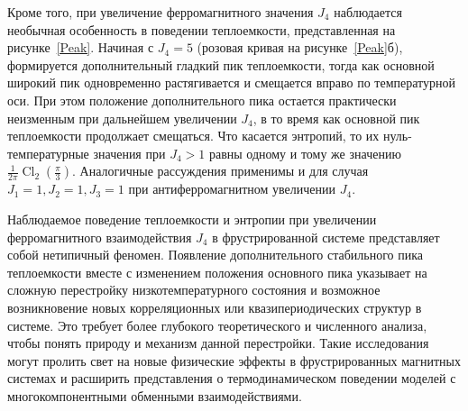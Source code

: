 \documentclass[utf8,12pt]{jetp}
\DeclareMathOperator{\Cl}{Cl}
\begin{document}
Кроме того, при увеличение ферромагнитного значения $J_4$ наблюдается необычная особенность в поведении теплоемкости, представленная на рисунке~\ref{Peak}. Начиная с $J_4 = 5$ (розовая кривая на рисунке~\ref{Peak}б), формируется дополнительный гладкий пик теплоемкости, тогда как основной широкий пик одновременно растягивается и смещается вправо по температурной оси. При этом положение дополнительного пика остается практически неизменным при дальнейшем увеличении $J_4$, в то время как основной пик теплоемкости продолжает смещаться. Что касается энтропий, то их нуль-температурные значения при $J_4>1$ равны одному и тому же значению $\frac{1}{2\pi} \Cl_2 (\frac{\pi}{3})$. Аналогичные рассуждения применимы и для случая $J_1 = 1, J_2 = 1, J_3 = 1$ при антиферромагнитном увеличении $J_4$.

Наблюдаемое поведение теплоемкости и энтропии при увеличении ферромагнитного взаимодействия $J_4$ в фрустрированной системе представляет собой нетипичный феномен. Появление дополнительного стабильного пика теплоемкости вместе с изменением положения основного пика указывает на сложную перестройку низкотемпературного состояния и возможное возникновение новых корреляционных или квазипериодических структур в системе. Это требует более глубокого теоретического и численного анализа, чтобы понять природу и механизм данной перестройки. Такие исследования могут пролить свет на новые физические эффекты в фрустрированных магнитных системах и расширить представления о термодинамическом поведении моделей с многокомпонентными обменными взаимодействиями.
\end{document}
